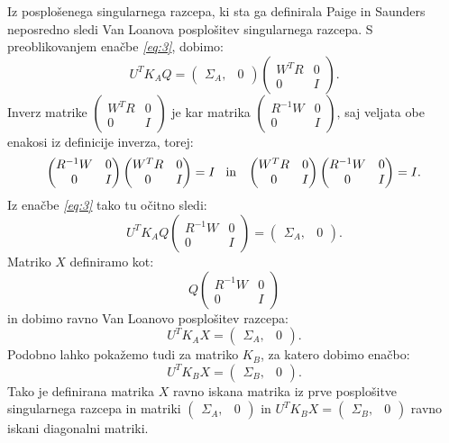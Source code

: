 \documentclass[mat1]{article}
\begin{document}
Iz posplošenega singularnega razcepa, ki sta ga definirala Paige in Saunders neposredno sledi Van Loanova posplošitev singularnega razcepa. 
S preoblikovanjem enačbe \textit{\eqref{eq:3}}, dobimo:
$$U^T K_A Q = \left(\begin{array}{cc} \Sigma_A, & 0 \end{array}\right)
\begin{pmatrix}
W^TR & 0 \\
0 & I 
\end{pmatrix} \text{.}$$
Inverz matrike
$\begin{pmatrix}
W^TR & 0 \\
0 & I 
\end{pmatrix} $
je kar matrika 
$\begin{pmatrix}
R^{-1} W & 0 \\
0 & I 
\end{pmatrix} \text{,}$
saj veljata obe enakosi iz definicije inverza, torej:
$$\begin{pmatrix}
R^{-1} W & 0 \\
0 & I 
\end{pmatrix}
\begin{pmatrix}
W^TR & 0 \\
0 & I 
\end{pmatrix}
= I \hspace{3mm}\text{in} \hspace{3mm}
\begin{pmatrix}
W^TR & 0 \\
0 & I 
\end{pmatrix}
\begin{pmatrix}
R^{-1} W & 0 \\
0 & I 
\end{pmatrix}
= I \text{.}$$
Iz enačbe \textit{\eqref{eq:3}} tako tu očitno sledi:
$$ U^T K_A Q
\begin{pmatrix}
R^{-1} W & 0 \\
0 & I 
\end{pmatrix}
=
\left(\begin{array}{cc} \Sigma_A, & 0 \end{array}\right) \text{.}
$$
Matriko $X$ definiramo kot:
$$ Q
\begin{pmatrix}
R^{-1} W & 0 \\
0 & I 
\end{pmatrix}
$$ in dobimo ravno Van Loanovo posplošitev razcepa:
$$ U^T K_A X = \left(\begin{array}{cc} \Sigma_A, & 0 \end{array}\right) \text{.}
$$
Podobno lahko pokažemo tudi za matriko $K_B$, za katero dobimo enačbo:
$$ U^T K_B X = \left(\begin{array}{cc} \Sigma_B, & 0 \end{array}\right) \text{.}
$$
Tako je definirana matrika $X$ ravno iskana matrika iz prve posplošitve singularnega razcepa in matriki $\left(\begin{array}{cc} \Sigma_A, & 0 \end{array}\right)$ in $ U^T K_B X = \left(\begin{array}{cc} \Sigma_B, & 0 \end{array}\right)$ ravno iskani diagonalni matriki.
\end{document}
